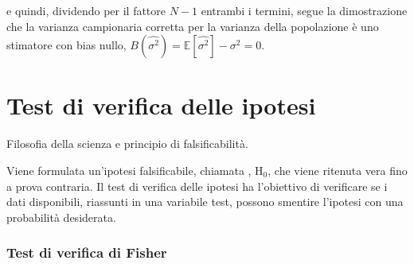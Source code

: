 \documentclass[letterpaper,10pt,italian]{jupyterBook}
\begin{document}
\sphinxAtStartPar
e quindi, dividendo per il fattore \(N-1\) entrambi i termini, segue la dimostrazione che la varianza campionaria corretta per la varianza della popolazione è uno stimatore con bias nullo, \(B(\hat{\sigma^2}) = \mathbb{E}[\hat{\sigma^2}] - \sigma^2 = 0\).



\sphinxstepscope


\section{Test di verifica delle ipotesi}
\label{\detokenize{ch/statistics/hp-test:test-di-verifica-delle-ipotesi}}\label{\detokenize{ch/statistics/hp-test:statistics-hs-inference-hp-test}}\label{\detokenize{ch/statistics/hp-test::doc}}
\sphinxAtStartPar
{} Filosofia della scienza e principio di falsificabilità.

\sphinxAtStartPar
{} Viene formulata un’ipotesi falsificabile, chiamata , \(\text{H}_{0}\), che viene ritenuta vera fino a prova contraria. Il test di verifica delle ipotesi ha l’obiettivo di verificare se i dati disponibili, riassunti in una variabile test, possono smentire l’ipotesi con una probabilità desiderata.
\subsubsection*{Test di verifica di Fisher}
\end{document}
